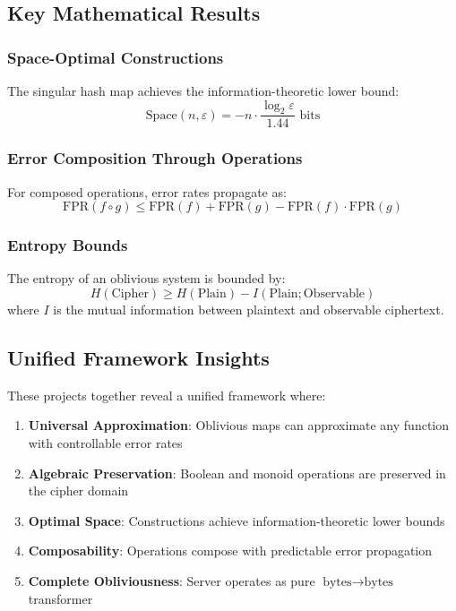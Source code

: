 \subsection{Key Mathematical Results}

\subsubsection{Space-Optimal Constructions}

The singular hash map achieves the information-theoretic lower bound:
\begin{equation}
\text{Space}(n, \varepsilon) = -n \cdot \frac{\log_2 \varepsilon}{1.44} \text{ bits}
\end{equation}

\subsubsection{Error Composition Through Operations}

For composed operations, error rates propagate as:
\begin{equation}
\text{FPR}(f \circ g) \leq \text{FPR}(f) + \text{FPR}(g) - \text{FPR}(f) \cdot \text{FPR}(g)
\end{equation}

\subsubsection{Entropy Bounds}

The entropy of an oblivious system is bounded by:
\begin{equation}
H(\text{Cipher}) \geq H(\text{Plain}) - I(\text{Plain}; \text{Observable})
\end{equation}
where $I$ is the mutual information between plaintext and observable ciphertext.

\subsection{Unified Framework Insights}

These projects together reveal a unified framework where:

\begin{enumerate}
\item \textbf{Universal Approximation}: Oblivious maps can approximate any function with controllable error rates
\item \textbf{Algebraic Preservation}: Boolean and monoid operations are preserved in the cipher domain
\item \textbf{Optimal Space}: Constructions achieve information-theoretic lower bounds
\item \textbf{Composability}: Operations compose with predictable error propagation
\item \textbf{Complete Obliviousness}: Server operates as pure $\text{bytes} \rightarrow \text{bytes}$ transformer
\end{enumerate}

